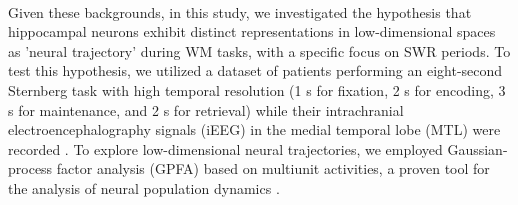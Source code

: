 \documentclass[final,3p,times,twocolumn]{elsarticle}
\begin{document}
\\
\indent
Given these backgrounds, in this study, we investigated the hypothesis that hippocampal neurons exhibit distinct representations in low-dimensional spaces as 'neural trajectory' during WM tasks, with a specific focus on SWR periods. To test this hypothesis, we utilized a dataset of patients performing an eight-second Sternberg task with high temporal resolution (1 s for fixation, 2 s for encoding, 3 s for maintenance, and 2 s for retrieval) while their intrachranial electroencephalography signals (iEEG) in the medial temporal lobe (MTL) were recorded \cite{boran_dataset_2020}. To explore low-dimensional neural trajectories, we employed Gaussian-process factor analysis (GPFA) based on multiunit activities, a proven tool for the analysis of neural population dynamics \cite{yu_gaussian-process_2009}.
\label{sec:introduction}

\end{document}
